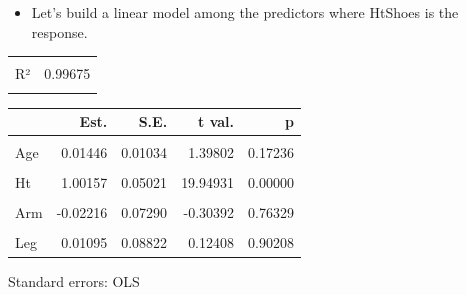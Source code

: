 \documentclass[
  ignorenonframetext,
]{beamer}
\providecommand{\tightlist}{%
  \setlength{\itemsep}{0pt}\setlength{\parskip}{0pt}}\usepackage{longtable,booktabs,array}
\begin{document}
\begin{frame}{}
\protect\hypertarget{section-9}{}
\begin{itemize}
\tightlist
\item
  Let's build a linear model among the predictors where HtShoes is the
  response.
\end{itemize}

\begin{table}[!h]
\centering
\begin{tabular}{lr}
\toprule
\cellcolor{gray!6}{F(7,30)} & \cellcolor{gray!6}{1313.26876}\\
R² & 0.99675\\
\cellcolor{gray!6}{Adj. R²} & \cellcolor{gray!6}{0.99599}\\
\bottomrule
\end{tabular}
\end{table} \begin{table}[!h]
\centering
\begin{threeparttable}
\begin{tabular}{lrrrr}
\toprule
  & Est. & S.E. & t val. & p\\
\midrule
\cellcolor{gray!6}{(Intercept)} & \cellcolor{gray!6}{0.23145} & \cellcolor{gray!6}{3.11789} & \cellcolor{gray!6}{0.07423} & \cellcolor{gray!6}{0.94132}\\
Age & 0.01446 & 0.01034 & 1.39802 & 0.17236\\
\cellcolor{gray!6}{Weight} & \cellcolor{gray!6}{-0.00241} & \cellcolor{gray!6}{0.00618} & \cellcolor{gray!6}{-0.38923} & \cellcolor{gray!6}{0.69986}\\
Ht & 1.00157 & 0.05021 & 19.94931 & 0.00000\\
\cellcolor{gray!6}{Seated} & \cellcolor{gray!6}{0.04869} & \cellcolor{gray!6}{0.06986} & \cellcolor{gray!6}{0.69693} & \cellcolor{gray!6}{0.49121}\\
\addlinespace
Arm & -0.02216 & 0.07290 & -0.30392 & 0.76329\\
\cellcolor{gray!6}{Thigh} & \cellcolor{gray!6}{-0.06058} & \cellcolor{gray!6}{0.04855} & \cellcolor{gray!6}{-1.24785} & \cellcolor{gray!6}{0.22174}\\
Leg & 0.01095 & 0.08822 & 0.12408 & 0.90208\\
\bottomrule
\end{tabular}
\begin{tablenotes}
\item Standard errors: OLS
\end{tablenotes}
\end{threeparttable}
\end{table}
\end{frame}
\end{document}

